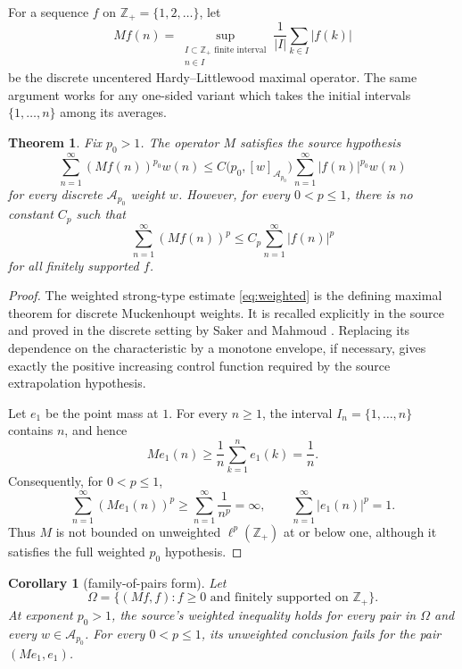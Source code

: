 \documentclass[11pt]{article}
\newtheorem{theorem}{Theorem}
\newtheorem{corollary}{Corollary}
\newcommand{\Zp}{\mathbb Z_+}
\newcommand{\Ap}{\mathcal A}
\begin{document}
For a sequence $f$ on $\Zp=\{1,2,\ldots\}$, let
\[
 Mf(n)=\sup_{\substack{I\subset\Zp\text{ finite interval}\\ n\in I}}
 \frac1{|I|}\sum_{k\in I}|f(k)|
\]
be the discrete uncentered Hardy--Littlewood maximal operator.  The same
argument works for any one-sided variant which takes the initial intervals
$\{1,\ldots,n\}$ among its averages.

\begin{theorem}\label{thm:counterexample}
Fix $p_0>1$.  The operator $M$ satisfies the source hypothesis
\begin{equation}\label{eq:weighted}
 \sum_{n=1}^{\infty}(Mf(n))^{p_0}w(n)
 \le C\bigl(p_0,[w]_{\Ap_{p_0}}\bigr)
 \sum_{n=1}^{\infty}|f(n)|^{p_0}w(n)
\end{equation}
for every discrete $\Ap_{p_0}$ weight $w$.  However, for every
$0<p\le1$, there is no constant $C_p$ such that
\[
 \sum_{n=1}^{\infty}(Mf(n))^p
 \le C_p\sum_{n=1}^{\infty}|f(n)|^p
\]
for all finitely supported $f$.
\end{theorem}

\begin{proof}
The weighted strong-type estimate \eqref{eq:weighted} is the defining
maximal theorem for discrete Muckenhoupt weights.  It is recalled explicitly
in the source and proved in the discrete setting by Saker and Mahmoud
\cite{sakermahmoud}.  Replacing its dependence on the characteristic by a
monotone envelope, if necessary, gives exactly the positive increasing
control function required by the source extrapolation hypothesis.

Let $e_1$ be the point mass at $1$.  For every $n\ge1$, the interval
$I_n=\{1,\ldots,n\}$ contains $n$, and hence
\[
 Me_1(n)\ge \frac1n\sum_{k=1}^n e_1(k)=\frac1n.
\]
Consequently, for $0<p\le1$,
\[
 \sum_{n=1}^{\infty}(Me_1(n))^p
 \ge \sum_{n=1}^{\infty}\frac1{n^p}=\infty,
 \qquad
 \sum_{n=1}^{\infty}|e_1(n)|^p=1.
\]
Thus $M$ is not bounded on unweighted $\ell^p(\Zp)$ at or below one,
although it satisfies the full weighted $p_0$ hypothesis.
\end{proof}

\begin{corollary}[family-of-pairs form]
Let
\[
 \Omega=\{(Mf,f): f\ge0\text{ and finitely supported on }\Zp\}.
\]
At exponent $p_0>1$, the source's weighted inequality holds for every pair
in $\Omega$ and every $w\in\Ap_{p_0}$.  For every $0<p\le1$, its
unweighted conclusion fails for the pair $(Me_1,e_1)$.
\end{corollary}
\end{document}
